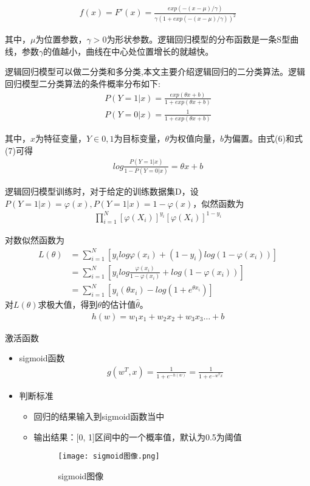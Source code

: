 \begin{align}
	f(x)=F'(x) = \frac{exp(-(x-\mu)/\gamma)}{\gamma(1+exp(-(x-\mu)/\gamma))^2}
\end{align}

其中，$\mu$为位置参数，$\gamma>0$为形状参数。逻辑回归模型的分布函数是一条S型曲线，参数$\gamma$的值越小，曲线在中心处位置增长的就越快。

逻辑回归模型可以做二分类和多分类,本文主要介绍逻辑回归的二分类算法。逻辑回归模型二分类算法的条件概率分布如下:
\begin{align}
	P(Y=1|x)=\frac{exp(\theta x + b)}{1 + exp(\theta x + b)}
\end{align}
\begin{align}
	P(Y=0|x)=\frac{1}{1 + exp(\theta x + b)}
\end{align}


其中，$x$为特征变量，$Y\in {0,1}$为目标变量，$\theta$为权值向量，$b$为偏置。由式(6)和式(7)可得
\begin{align}
	log\frac{P(Y=1|x)}{1-P(Y=0|x)}=\theta x + b
\end{align}

逻辑回归模型训练时，对于给定的训练数据集D，设$P(Y=1|x)=\varphi(x),P(Y=1|x)=1-\varphi(x)$，似然函数为
\begin{align}
	\prod^N_{i=1}[\varphi(X_i)]^{y_i}[\varphi(X_i)]^{1-y_i}
\end{align}

对数似然函数为
\begin{align}
	L(\theta)&=\sum^N_{i=1}[y_ilog\varphi(x_i) + (1-y_i)log(1-\varphi(x_i))]\\
	&=\sum^N_{i=1}[y_ilog\frac{\varphi(x_i)}{1-\varphi(x_i)}+log(1-\varphi(x_i))]\\
	&=\sum^N_{i=1}[y_i(\theta x_i)-log(1+e^{\theta x_i})]
\end{align}
对$L(\theta)$求极大值，得到$\theta$的估计值$\hat{\theta}$。
\begin{align}
	h(w)=w_1 x_1+w_2 x_2+w_3 x_3 \ldots+b
\end{align}

激活函数 
\begin{itemize}
	\item sigmoid函数
	\begin{align}
		g\left(w^T, x\right)=\frac{1}{1+e^{-h(w)}}=\frac{1}{1+e^{-w^T x}}
	\end{align}
	\item 判断标准
	\begin{itemize}
		\item 回归的结果输入到sigmoid函数当中
		\item 输出结果：[0, 1]区间中的一个概率值，默认为0.5为阈值
		\begin{figure}[!h]
			\centering
			\texttt{[image: sigmoid图像.png]}
			\setlength{\abovecaptionskip}{3pt}%
			\caption{sigmoid图像}
			\label{p-13}
		\end{figure}
	\end{itemize}
\end{itemize}

